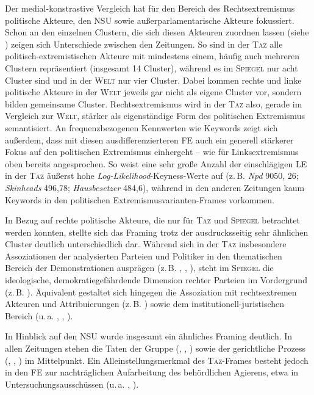 Der medial-konstrastive Vergleich hat für den Bereich des Rechtsextremismus politische Akteure, den NSU sowie außerparlamentarische Akteure fokussiert. Schon an den einzelnen Clustern, die sich diesen Akteuren zuordnen lassen (siehe ) zeigen sich Unterschiede zwischen den Zeitungen. So sind in der \textsc{Taz} alle politisch-extremistischen Akteure mit mindestens einem, häufig auch mehreren Clustern repräsentiert (insgesamt 14 Cluster), während es im \textsc{Spiegel} nur acht Cluster sind und in der \textsc{Welt} nur vier Cluster. Dabei kommen rechte und linke politische Akteure in der \textsc{Welt} jeweils gar nicht als eigene Cluster vor, sondern bilden gemeinsame Cluster. Rechtsextremismus wird in der \textsc{Taz} also, gerade im Vergleich zur \textsc{Welt}, stärker als eigenständige Form des politischen Extremismus semantisiert. An frequenzbezogenen Kennwerten wie Keywords zeigt sich außerdem, dass mit diesen ausdifferenzierteren FE auch ein generell stärkerer Fokus auf den politischen Extremismus einhergeht -- wie für Linksextremismus oben bereits angesprochen. So weist eine sehr große Anzahl der einschlägigen LE in der \textsc{Taz} äußerst hohe \emph{Log-Likelihood}-Keyness-Werte auf (z.\,B. \emph{Npd} 9050, 26; \emph{Skinheads} 496,78; \emph{Hausbesetzer} 484,6), während in den anderen Zeitungen kaum Keywords in den politischen Extremismusvarianten-Frames vorkommen.

In Bezug auf rechte politische Akteure, die nur für \textsc{Taz} und \textsc{Spiegel} betrachtet werden konnten, stellte sich das Framing trotz der ausdrucksseitig sehr ähnlichen Cluster deutlich unterschiedlich dar. Während sich in der \textsc{Taz} insbesondere Assoziationen der analysierten Parteien und Politiker in den thematischen Bereich der Demonstrationen ausprägen (z.\,B. , , ), steht im \textsc{Spiegel} die ideologische, demokratiegefährdende Dimension rechter Parteien im Vordergrund (z.\,B. ). Äquivalent gestaltet sich hingegen die Assoziation mit rechtsextremen Akteuren und Attribuierungen (z.\,B. ) sowie dem institutionell-juristischen Bereich (u.\,a. , , ).

In Hinblick auf den NSU wurde insgesamt ein ähnliches Framing deutlich. In allen Zeitungen stehen die Taten der Gruppe (, , ) sowie der gerichtliche Prozess (, , ) im Mittelpunkt. Ein Alleinstellungsmerkmal des \textsc{Taz}-Frames besteht jedoch in den FE zur nachträglichen Aufarbeitung des behördlichen Agierens, etwa in Untersuchungsausschüssen (u.\,a. , ).

